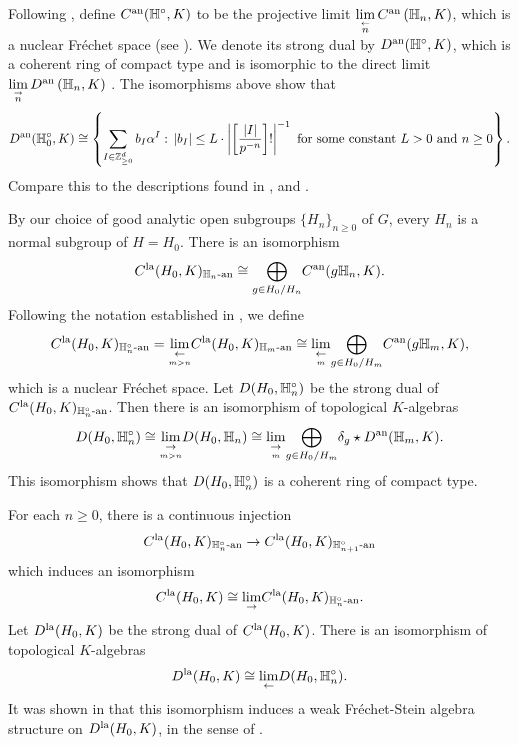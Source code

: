 \documentclass[10pt]{amsart}
\begin{document}
Following \cite{analytic}, define $C^{\textnormal{an}}(\mathbb{H}^{\circ},K)$ to be the projective limit $\underset{\overset{\leftarrow}{n}}{\lim }\,C^{\textnormal{an}}\left(\mathbb{H}_{n},K\right)$, which is a nuclear Fr\'{e}chet space (see \cite[Def. 1.1]{summary}). We denote its strong dual by $D^{\textnormal{an}}(\mathbb{H}^{\circ},K)$, which is a coherent ring of compact type and is isomorphic to the direct limit $\underset{\overset{\rightarrow}{n}}{\lim }\,D^{\textnormal{an}}\left(\mathbb{H}_{n},K\right)$ \cite[Cor. 5.3.12]{analytic}. The isomorphisms above show that \begin{equation}\label{eqn:dist2}
    D^{\textnormal{an}}(\mathbb{H}^{\circ}_{0},K)\cong \left\{\sum_{I\in \mathbb{Z}_{\geq 0}^{d}} b_{I} \alpha^{I}:\, |b_{I}|\leq L\cdot\left|\left[\frac{|I|}{p^{-n}}\right]!\right|^{-1} \textnormal{ for some constant } L>0 \textnormal{ and } n\geq 0 \right\}.
\end{equation} Compare this to the descriptions found in \cite{analytic}, \cite[]{ST_dist} and \cite[]{ST_GL2}.

By our choice of good analytic open subgroups $\{H_{n}\}_{n\geq 0}$ of $G$, every $H_n$ is a normal subgroup of $H=H_0$. There is an isomorphism \[
    C^{\textnormal{la}}(H_{0},K)_{\mathbb{H}_{n}\textnormal{-an}} \cong \underset{{g\in H_{0}/H_{n}}}{\bigoplus} C^{\textnormal{an}}(g\mathbb{H}_{n},K). 
\] Following the notation established in \cite{analytic}, we define \[
    C^{\textnormal{la}}(H_{0},K)_{\mathbb{H}^{\circ}_{n}\textnormal{-an}} = \underset{\underset{m>n}{\leftarrow}}{\lim} C^{\textnormal{la}}(H_{0},K)_{\mathbb{H}_{m}\textnormal{-an}} \cong \underset{\underset{m}{\leftarrow}}{\lim} \underset{{g\in H_{0}/H_{m}}}{\bigoplus} C^{\textnormal{an}}(g\mathbb{H}_{m},K),
\] which is a nuclear Fr\'echet space. Let $D(H_{0},\mathbb{H}^{\circ}_{n})$ be the strong dual of $C^{\textnormal{la}}(H_{0},K)_{\mathbb{H}^{\circ}_{n}\textnormal{-an}}$. Then there is an isomorphism of topological $K$-algebras \begin{equation}\label{eqn:dist3}
    D(H_{0},\mathbb{H}^{\circ}_{n}) \cong \underset{\underset{m>n}{\rightarrow}}{\lim}D(H_{0},\mathbb{H}_{n}) \cong \underset{\underset{m}{\rightarrow}}{\lim} \underset{{g\in H_{0}/H_{m}}}{\bigoplus} \delta_{g}\star D^{\textnormal{an}}(\mathbb{H}_{m},K). 
\end{equation} This isomorphism shows that $D(H_{0},\mathbb{H}^{\circ}_{n})$ is a coherent ring of compact type.

For each $n\geq 0$, there is a continuous injection \[
    C^{\textnormal{la}}(H_{0},K)_{\mathbb{H}^{\circ}_{n}\textnormal{-an}} \rightarrow C^{\textnormal{la}}(H_{0},K)_{\mathbb{H}^{\circ}_{n+1}\textnormal{-an}} 
\] which induces an isomorphism \[
    C^{\textnormal{la}}(H_{0},K) \cong \underset{\rightarrow}{\lim}  C^{\textnormal{la}}(H_{0},K)_{\mathbb{H}^{\circ}_{n}\textnormal{-an}}.
\] Let $D^{\textnormal{la}}(H_{0},K)$ be the strong dual of $C^{\textnormal{la}}(H_{0},K)$. There is an isomorphism of topological $K$-algebras \[
    D^{\textnormal{la}}(H_{0},K) \cong  \underset{\leftarrow}{\lim}  D(H_{0},\mathbb{H}^{\circ}_{n}).
\] It was shown in \cite[]{analytic} that this isomorphism induces a weak Fr\'echet-Stein algebra structure on $D^{\textnormal{la}}(H_{0},K)$, in the sense of \cite[Def. 1.2.6]{analytic}.
\end{document}
